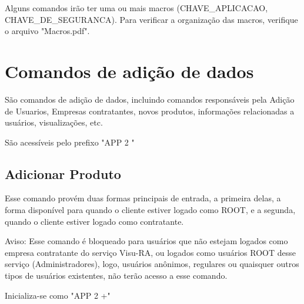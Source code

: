 \documentclass{article}
\begin{document}
		\par Alguns comandos irão ter uma ou mais macros (CHAVE\_APLICACAO, CHAVE\_DE\_SEGURANCA). Para verificar a organização das macros, verifique o arquivo "Macros.pdf".

	\section{Comandos de adição de dados}\indent
		\par São comandos de adição de dados, incluindo comandos responsáveis pela Adição de Usuarios, Empresas contratantes, novos produtos, informações relacionadas a usuários, visualizações, etc.
		\par São acessíveis pelo prefixo "APP 2 "

		\subsection{Adicionar Produto}\indent
			\par Esse comando provém duas formas principais de entrada, a primeira delas, a forma disponível para quando o cliente estiver logado como ROOT, e a segunda, quando o cliente estiver logado como contratante.
			\par Aviso: Esse comando é bloqueado para usuários que não estejam logados como empresa contratante do serviço Visu-RA, ou logados como usuários ROOT desse serviço (Administradores), logo, usuários anônimos, regulares ou quaisquer outros tipos de usuários existentes, não terão acesso a esse comando.
			\par Inicializa-se como "APP 2 +"
\end{document}
